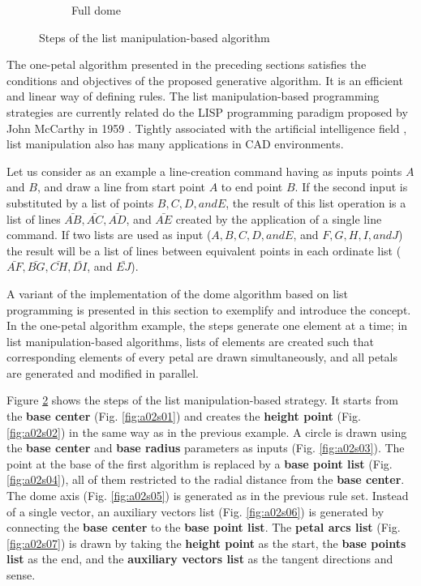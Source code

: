\documentclass[preprint,12pt,3p]{elsarticle}
\begin{document}
\begin{figure}
\begin{subfigure}{0.3\textwidth}
  \caption{Full dome}
  \label{fig:a02s09}
\end{subfigure}


\caption{Steps of the list manipulation-based algorithm}
\label{fig:a02steps}
\end{figure}

The one-petal algorithm presented in the preceding sections satisfies the conditions and objectives of the proposed generative algorithm. It is an efficient and linear way of defining rules. The list manipulation-based programming strategies are currently related do the LISP programming paradigm proposed by John McCarthy in 1959 \cite{McCarthy1960}. Tightly associated with the artificial intelligence field \cite{Steele:1996:EL:234286.1057818}, list manipulation also has many applications in CAD environments. 

Let us consider as an example a line-creation command having as inputs points $A$ and $B$, and draw a line from start point $A$ to end point $B$. If the second input is substituted by a list of points $B, C, D, and E$, the result of this list operation is a list of lines $\bar{AB}, \bar{AC}, \bar{AD}$, and $\bar{AE}$ created by the application of a single line command. If two lists are used as input ($A, B, C, D, and E$, and $F, G, H, I, and J$) the result will be a list of lines between equivalent points in each ordinate list ($\bar{AF}, \bar{BG}, \bar{CH}, \bar{DI}$, and $\bar{EJ}$).

A variant of the implementation of the dome algorithm based on list programming is presented in this section to exemplify and introduce the concept. In the one-petal algorithm example, the steps generate one element at a time; in list manipulation-based algorithms, lists of elements are created such that corresponding elements of every petal are drawn simultaneously, and all petals are generated and modified in parallel.

Figure \ref{fig:a02steps} shows the steps of the list manipulation-based strategy. It starts from the \textbf{base center} (Fig. \ref{fig:a02s01}) and creates the \textbf{height point} (Fig. \ref{fig:a02s02}) in the same way as in the previous example. A circle is drawn using the \textbf{base center} and \textbf{base radius} parameters as inputs (Fig. \ref{fig:a02s03}). The point at the base of the first algorithm is replaced by a \textbf{base point list} (Fig. \ref{fig:a02s04}), all of them restricted to the radial distance from the \textbf{base center}. The dome axis (Fig. \ref{fig:a02s05}) is generated as in the previous rule set. Instead of a single vector, an auxiliary vectors list (Fig. \ref{fig:a02s06}) is generated by connecting the \textbf{base center} to the \textbf{base point list}. The \textbf{petal arcs list} (Fig. \ref{fig:a02s07}) is drawn by taking the \textbf{height point} as the start, the \textbf{base points list} as the end, and the \textbf{auxiliary vectors list} as the tangent directions and sense.
\end{document}

